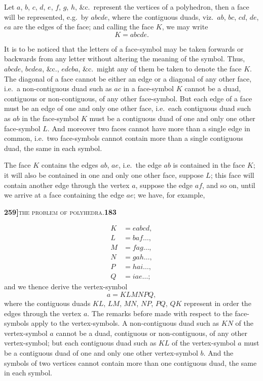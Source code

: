 \documentclass[11pt]{article}
\begin{document}
\medskip


\bigskip

\noindent Let $a$, $b$, $c$, $d$, $e$, $f$, $g$, $h$, \&c.\ represent the vertices of a polyhedron, then a face will be represented, e.g.\ by $abcde$, where the contiguous duads, viz.\ $ab$, $bc$, $cd$, $de$, $ea$ are the edges of the face; and calling the face $K$, we may write
\[
K = abcde. \tag{1}
\]

It is to be noticed that the letters of a face-symbol may be taken forwards or backwards from any letter without altering the meaning of the symbol. Thus, $abcde$, $bcdea$, \&c., $edcba$, \&c.\ might any of them be taken to denote the face $K$. The diagonal of a face cannot be either an edge or a diagonal of any other face, i.e.\ a non-contiguous duad such as $ac$ in a face-symbol $K$ cannot be a duad, contiguous or non-contiguous, of any other face-symbol. But each edge of a face must be an edge of one and only one other face, i.e.\ each contiguous duad such as $ab$ in the face-symbol $K$ must be a contiguous duad of one and only one other face-symbol $L$. And moreover two faces cannot have more than a single edge in common, i.e.\ two face-symbols cannot contain more than a single contiguous duad, the same in each symbol.

The face $K$ contains the edges $ab$, $ae$, i.e.\ the edge $ab$ is contained in the face $K$; it will also be contained in one and only one other face, suppose $L$; this face will contain another edge through the vertex $a$, suppose the edge $af$, and so on, until we arrive at a face containing the edge $ae$; we have, for example,

\newpage

\noindent\textbf{259]}\hfill\textsc{the problem of polyhedra.}\hfill\textbf{183}

\medskip

\[
\begin{aligned}
K &= eabcd,\\
L &= baf\ldots,\\
M &= fag\ldots,\\
N &= gah\ldots,\\
P &= hai\ldots,\\
Q &= iae\ldots;
\end{aligned}
\]
and we thence derive the vertex-symbol
\[
a = KLMNPQ, \tag{2}
\]
where the contiguous duads $KL$, $LM$, $MN$, $NP$, $PQ$, $QK$ represent in order the edges through the vertex $a$. The remarks before made with respect to the face-symbols apply to the vertex-symbols. A non-contiguous duad such as $KN$ of the vertex-symbol $a$ cannot be a duad, contiguous or non-contiguous, of any other vertex-symbol; but each contiguous duad such as $KL$ of the vertex-symbol $a$ must be a contiguous duad of one and only one other vertex-symbol $b$. And the symbols of two vertices cannot contain more than one contiguous duad, the same in each symbol.
\end{document}
